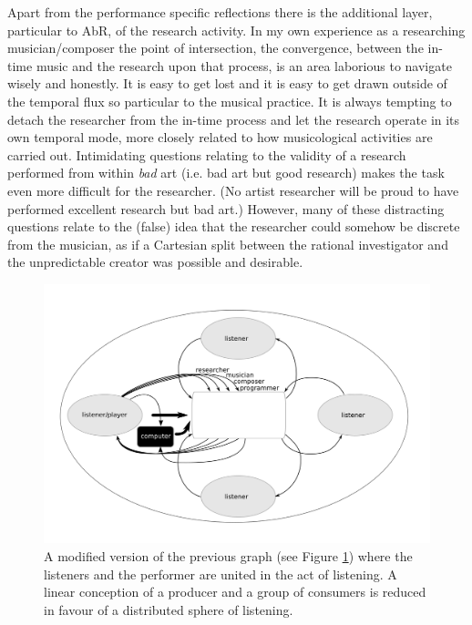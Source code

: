 Apart from the performance specific reflections there is the additional layer, particular to AbR, of the research activity. In my own experience as a researching musician/composer the point of intersection, the convergence, between the in-time music and the research upon that process, is an area laborious to navigate wisely and honestly. It is easy to get lost and it is easy to get drawn outside of the temporal flux so particular to the musical practice. It is always tempting to detach the researcher from the in-time process and let the research operate in its own temporal mode, more closely related to how musicological activities are carried out. Intimidating questions relating to the validity of a research performed from within \emph{bad} art (i.e. bad art but good research) makes the task even more difficult for the researcher. (No artist researcher will be proud to have performed excellent research but bad art.) However, many of these distracting questions relate to the (false) idea that the researcher could somehow be discrete from the musician, as if a Cartesian split between the rational investigator and the unpredictable creator was possible and desirable. 

\begin{figure}[htb]
  \centering
  \includegraphics[width=\linewidth]{img/player-listener-computer}
  \caption{\small{A modified version of the previous graph (see Figure \ref{fig:player-comp}) where the listeners and the performer are united in the act of listening. A linear conception of a producer and a group of consumers is reduced in favour of a distributed sphere of listening.}}
  \label{fig:player-comp}
\end{figure}

